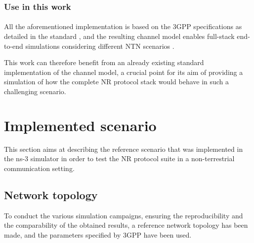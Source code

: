 \subsubsection{Use in this work}
\paragraph{}
All the aforementioned implementation is based on the \ac{3GPP} specifications as detailed in the standard \cite{3gpp-tr-38.811}, and the resulting channel model enables full-stack end-to-end simulations considering different \ac{NTN} scenarios \cite{Sandri_2023}.

This work can therefore benefit from an already existing standard implementation of the channel model, a crucial point for its aim of providing a simulation of how the complete \ac{NR} protocol stack would behave in such a challenging scenario. 

\section{Implemented scenario}

This section aims at describing the reference scenario that was implemented in the ns-3 simulator in order to test the \ac{NR} protocol suite in a non-terrestrial communication setting.

\subsection{Network topology}
To conduct the various simulation campaigns, ensuring the reproducibility and the comparability of the obtained results, a reference network topology has been made, and the parameters specified by \ac{3GPP} have been used.

